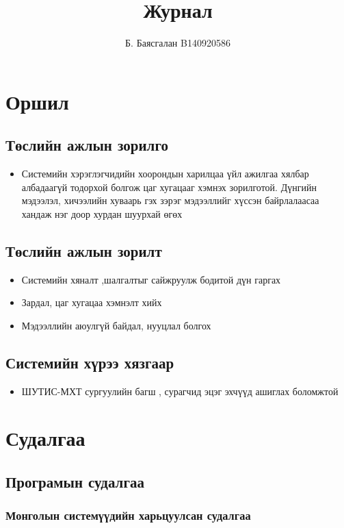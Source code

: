 \documentclass[12pd]{article}
\title{Журнал}
\author{Б. Баясгалан B140920586}
\begin{document}
	
	\section {Оршил}
	\subsection {Төслийн ажлын зорилго}
	\begin{itemize}
		\item Системийн хэрэглэгчидийн  хоорондын  харилцаа үйл ажилгаа   хялбар албадаагүй тодорхой болгож цаг хугацааг хэмнэх  зорилготой. Дүнгийн мэдээлэл, хичээлийн хуваарь  гэх зэрэг мэдээллийг хүссэн   байрлалаасаа хандаж  нэг доор  хурдан шуурхай өгөх
	\end{itemize} 
	\subsection { Төслийн ажлын зорилт}
	\begin{itemize}
		\item Системийн хяналт ,шалгалтыг  сайжруулж  бодитой дүн гаргах
		\item Зардал, цаг хугацаа хэмнэлт хийх  
		\item Мэдээллийн аюулгүй байдал, нууцлал болгох
	\end{itemize}
\subsection {Системийн хүрээ  хязгаар}
\begin{itemize}
	\item ШУТИС-МХТ сургуулийн  багш , сурагчид эцэг эхчүүд   ашиглах боломжтой
\end{itemize}
\section{Судалгаа}
\subsection{Програмын судалгаа}
\subsubsection{Монголын  системүүдийн харьцуулсан судалгаа}
\end{document}
